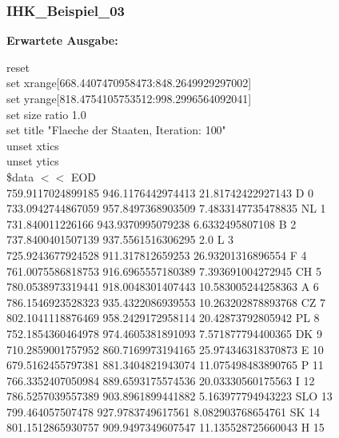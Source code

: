 \documentclass[a4paper,11pt]{article}
\begin{document}
{\subsubsection{IHK\_Beispiel\_03}
\vspace{5mm}
	\textbf{Erwartete Ausgabe:}
	\begin{mdframed}[linewidth=0pt, backgroundcolor=background, innertopmargin=10pt, innerbottommargin=10pt]
		reset\\
		set xrange[668.4407470958473:848.2649929297002]\\
		set yrange[818.4754105753512:998.2996564092041]\\
		set size ratio 1.0\\
		set title "Flaeche der Staaten, Iteration: 100"\\
		unset xtics\\
		unset ytics\\
		\$data $<<$ EOD\\
		759.9117024899185 946.1176442974413 21.81742422927143 D 0\\
		733.0942744867059 957.8497368903509 7.4833147735478835 NL 1\\
		731.840011226166 943.9370995079238 6.6332495807108 B 2\\
		737.8400401507139 937.5561516306295 2.0 L 3\\
		725.9243677924528 911.317812659253 26.93201316896554 F 4\\
		761.0075586818753 916.6965557180389 7.393691004272945 CH 5\\
		780.0538973319441 918.0048301407443 10.583005244258363 A 6\\
		786.1546923528323 935.4322086939553 10.263202878893768 CZ 7\\
		802.1041118876469 958.2429172958114 20.42873792805942 PL 8\\
		752.1854360464978 974.4605381891093 7.571877794400365 DK 9\\
		710.2859001757952 860.7169973194165 25.974346318370873 E 10\\
		679.5162455797381 881.3404821943074 11.075498483890765 P 11\\
		766.3352407050984 889.6593175574536 20.03330560175563 I 12\\
		786.5257039557389 903.8961899441882 5.163977794943223 SLO 13\\
		799.464057507478 927.9783749617561 8.082903768654761 SK 14\\
		801.1512865930757 909.9497349607547 11.135528725660043 H 15\\

\end{mdframed}}
\end{document}
